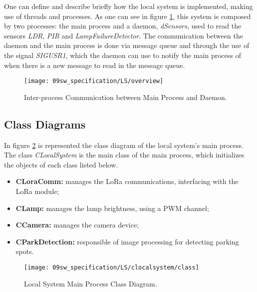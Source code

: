 One can define and describe briefly how the local system is implemented, making use of threads and processes. As one can see in figure \ref{fig:task_overview}, this system is composed by two processes: the main process and a daemon, \textit{dSensors}, used to read the sensors \textit{LDR}, \textit{PIR} and \textit{LampFailureDetector}. The communication between the daemon and the main process is done via message queue and through the use of the signal \textit{SIGUSR1}, which the daemon can use to notify the main process of when there is a new message to read in the message queue.

\begin{figure}[H]
	\centering
	\texttt{[image: 09sw\_specification/LS/overview]}
	\caption{Inter-process Communication between Main Process and Daemon.}
	\label{fig:task_overview}
\end{figure}

\subsection{Class Diagrams}
In figure \ref{fig:clocalsystem} is represented the class diagram of the local system's main process. The class \textit{CLocalSystem} is the main class of the main process, which initializes the objects of each class listed below.

\begin{itemize}
	\item \textbf{CLoraComm:} manages the LoRa communications, interfacing with the LoRa module;
	\item \textbf{CLamp:} manages the lamp brightness, using a PWM channel;	
	\item \textbf{CCamera:} manages the camera device;
	\item \textbf{CParkDetection:} responsible of image processing for detecting parking spots.
\end{itemize}

\begin{figure}[H]
	\centering
	\texttt{[image: 09sw\_specification/LS/clocalsystem/class]}
	\caption{Local System Main Process Class Diagram.}
	\label{fig:clocalsystem}
\end{figure}

